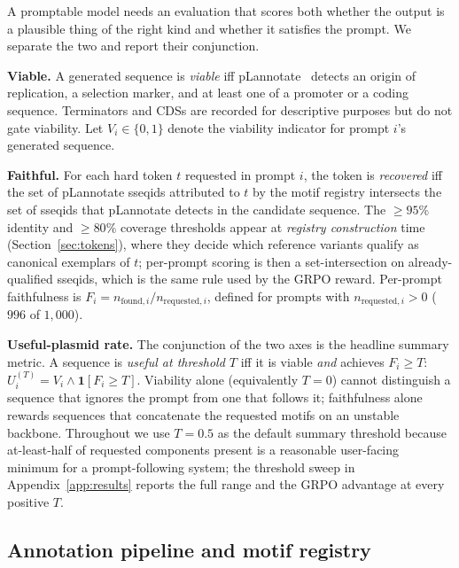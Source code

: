 \documentclass{article}
\begin{document}
A promptable model needs an evaluation that scores both whether the output is a
plausible thing of the right kind and whether it satisfies the prompt. We separate the
two and report their conjunction.

\textbf{Viable.} A generated sequence is \emph{viable} iff
pLannotate~\citep{mcguffie2021plannotate} detects an origin of replication, a selection
marker, and at least one of a promoter or a coding sequence. Terminators and CDSs are
recorded for descriptive purposes but do not gate viability. Let $V_i \in \{0,1\}$
denote the viability indicator for prompt $i$'s generated sequence.

\textbf{Faithful.} For each hard token $t$ requested in prompt $i$, the token is
\emph{recovered} iff the set of pLannotate sseqids attributed to $t$ by the motif
registry intersects the set of sseqids that pLannotate detects in the candidate
sequence. The $\geq\!95\%$ identity and $\geq\!80\%$ coverage thresholds appear at
\emph{registry construction} time (Section~\ref{sec:tokens}), where they decide which
reference variants qualify as canonical exemplars of $t$; per-prompt scoring is then a
set-intersection on already-qualified sseqids, which is the same rule used by the GRPO
reward. Per-prompt faithfulness is $F_i = n_{\text{found},i} / n_{\text{requested},i}$,
defined for prompts with $n_{\text{requested},i} > 0$ ($996$ of $1{,}000$).

\textbf{Useful-plasmid rate.} The conjunction of the two axes is the headline summary
metric. A sequence is \emph{useful at threshold $T$} iff it is viable \emph{and}
achieves $F_i \geq T$: $U_i^{(T)} = V_i \wedge \mathbf{1}[F_i \geq T]$. Viability alone
(equivalently $T{=}0$) cannot distinguish a sequence that ignores the prompt from one
that follows it; faithfulness alone rewards sequences that concatenate the requested
motifs on an unstable backbone. Throughout we use $T{=}0.5$ as the default summary
threshold because at-least-half of requested components present is a reasonable
user-facing minimum for a prompt-following system; the threshold sweep in
Appendix~\ref{app:results} reports the full range and the GRPO advantage at every
positive $T$.

\subsection{Annotation pipeline and motif registry}
\end{document}

